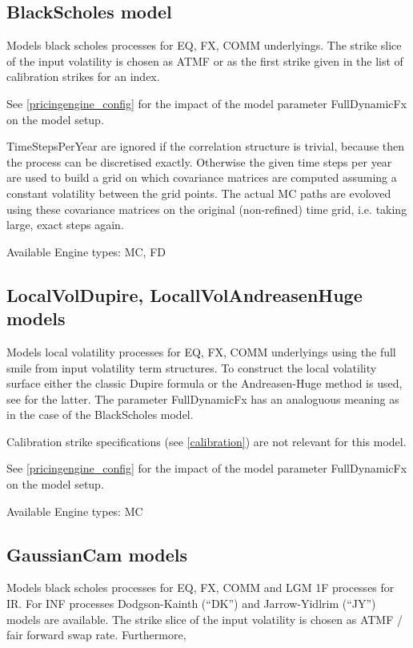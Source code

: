 \subsection{BlackScholes model}\label{blackscholes}

Models black scholes processes for EQ, FX, COMM underlyings. The strike slice of the input volatility is chosen as ATMF
or as the first strike given in the list of calibration strikes for an index.

See \ref{pricingengine_config} for the impact of the model parameter FullDynamicFx on the model setup.

TimeStepsPerYear are ignored if the correlation structure is trivial, because then the process can be discretised
exactly. Otherwise the given time steps per year are used to build a grid on which covariance matrices are computed
assuming a constant volatility between the grid points. The actual MC paths are evoloved using these covariance matrices
on the original (non-refined) time grid, i.e. taking large, exact steps again.

\smallskip
Available Engine types: MC, FD

\subsection{LocalVolDupire, LocallVolAndreasenHuge models}

Models local volatility processes for EQ, FX, COMM underlyings using the full smile from input volatility term
structures. To construct the local volatility surface either the classic Dupire formula or the Andreasen-Huge method is
used, see \cite{andreasen_huge_localvol} for the latter. The parameter FullDynamicFx has an analoguous meaning as in the
case of the BlackScholes model.

Calibration strike specifications (see \ref{calibration}) are not relevant for this model.

See \ref{pricingengine_config} for the impact of the model parameter FullDynamicFx on the model setup.

\smallskip
Available Engine types: MC

\subsection{GaussianCam models}

Models black scholes processes for EQ, FX, COMM and LGM 1F processes for IR. For INF processes Dodgson-Kainth (``DK'')
and Jarrow-Yidlrim (``JY'') models are available. The strike slice of the input volatility is chosen as ATMF / fair
forward swap rate. Furthermore,

